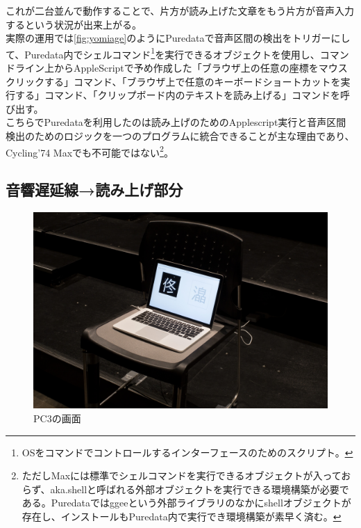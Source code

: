 \documentclass[a4paper,report]{jsbook}
\begin{document}
これが二台並んで動作することで、片方が読み上げた文章をもう片方が音声入力するという状況が出来上がる。\\
実際の運用では\cref{fig:yomiage}のようにPuredataで音声区間の検出をトリガーにして、Puredata内でシェルコマンド\footnote{OSをコマンドでコントロールするインターフェースのためのスクリプト。}を実行できるオブジェクトを使用し、コマンドライン上からAppleScriptで予め作成した「ブラウザ上の任意の座標をマウスクリックする」コマンド、「ブラウザ上で任意のキーボードショートカットを実行する」コマンド、「クリップボード内のテキストを読み上げる」コマンドを呼び出す。\\
こちらでPuredataを利用したのは読み上げのためのApplescript実行と音声区間検出のためのロジックを一つのプログラムに統合できることが主な理由であり、Cycling'74
Maxでも不可能ではない\footnote{ただしMaxには標準でシェルコマンドを実行できるオブジェクトが入っておらず、aka.shellと呼ばれる外部オブジェクトを実行できる環境構築が必要である。Puredataではggeeという外部ライブラリのなかにshellオブジェクトが存在し、インストールもPuredata内で実行でき環境構築が素早く済む。}。

\subsection{音響遅延線→読み上げ部分}\label{ux97f3ux97ffux9045ux5ef6ux7ddaux8aadux307fux4e0aux3052ux90e8ux5206}

\begin{no-prefix-figure-caption}

\begin{figure}[htbp]
\centering
\includegraphics[width=1.00000\textwidth]{./img/adm2_archive5.jpg}
\caption{PC3の画面}
\end{figure}

\end{no-prefix-figure-caption}
\end{document}
